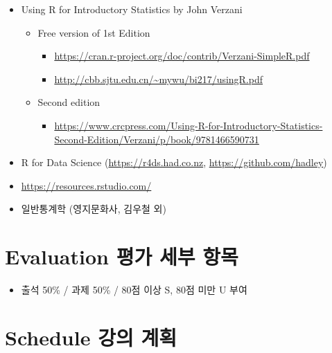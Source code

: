 \documentclass[]{book}
\providecommand{\tightlist}{%
  \setlength{\itemsep}{0pt}\setlength{\parskip}{0pt}}
\begin{document}
\begin{itemize}
\tightlist
\item
  Using R for Introductory Statistics by John Verzani

  \begin{itemize}
  \tightlist
  \item
    Free version of 1st Edition

    \begin{itemize}
    \tightlist
    \item
      \url{https://cran.r-project.org/doc/contrib/Verzani-SimpleR.pdf}
    \item
      \url{http://cbb.sjtu.edu.cn/~mywu/bi217/usingR.pdf}
    \end{itemize}
  \item
    Second edition

    \begin{itemize}
    \tightlist
    \item
      \url{https://www.crcpress.com/Using-R-for-Introductory-Statistics-Second-Edition/Verzani/p/book/9781466590731}
    \end{itemize}
  \end{itemize}
\item
  R for Data Science (\url{https://r4ds.had.co.nz}, \url{https://github.com/hadley})
\item
  \url{https://resources.rstudio.com/}
\item
  일반통계학 (영지문화사, 김우철 외)
\end{itemize}

\hypertarget{evaluation---}{%
\section{Evaluation 평가 세부 항목}\label{evaluation---}}

\begin{itemize}
\tightlist
\item
  출석 50\% / 과제 50\% / 80점 이상 S, 80점 미만 U 부여
\end{itemize}

\hypertarget{schedule--}{%
\section{Schedule 강의 계획}\label{schedule--}}
\end{document}
